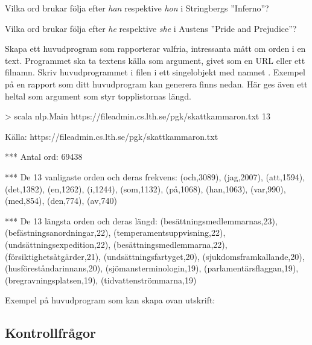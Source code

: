 \Subtask Vilka ord brukar följa efter \emph{han} respektive \emph{hon} i Stringbergs ''Inferno''?

\Subtask Vilka ord brukar följa efter \emph{he} respektive \emph{she} i Austens ''Pride and Prejudice''?


\Task Skapa ett huvudprogram som rapporterar valfria, intressanta mått om orden i en text. Programmet ska ta textens källa som argument, givet som en URL eller ett filnamn. Skriv huvudprogrammet i filen  i ett singelobjekt med namnet . Exempel på en rapport som ditt huvudprogram kan generera finns nedan. Här ges även ett heltal som argument som styr topplistornas längd.
\begin{REPL}
> scala nlp.Main https://fileadmin.cs.lth.se/pgk/skattkammaron.txt 13

Källa: https://fileadmin.cs.lth.se/pgk/skattkammaron.txt

*** Antal ord: 69438

*** De 13 vanligaste orden och deras frekvens:
(och,3089), (jag,2007), (att,1594), (det,1382), (en,1262),
(i,1244), (som,1132), (på,1068), (han,1063), (var,990),
(med,854), (den,774), (av,740)

*** De 13 längsta orden och deras längd:
(besättningsmedlemmarnas,23), (befästningsanordningar,22),
(temperamentsuppvisning,22), (undsättningsexpedition,22),
(besättningsmedlemmarna,22), (försiktighetsåtgärder,21),
(undsättningsfartyget,20), (sjukdomsframkallande,20),
(husföreståndarinnans,20), (sjömansterminologin,19),
(parlamentärsflaggan,19), (bregravningsplatsen,19),
(tidvattenströmmarna,19)
\end{REPL}

\noindent Exempel på huvudprogram som kan skapa ovan utskrift:

\subsection{Kontrollfrågor}

